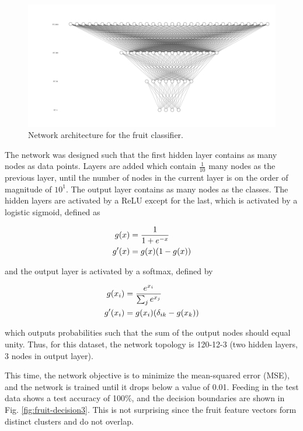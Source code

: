 \documentclass[12pt,a4paper]{article}
\begin{document}
\begin{figure}[htb]
	\centering
	\includegraphics[width=\textwidth]{fruit-net.png}
	\caption{Network architecture for the fruit classifier.}
	\label{fig:fruit-architecture}
\end{figure}

The network was designed such that the first hidden layer contains as many nodes as data points. Layers are added which contain $\frac{1}{10}$ many nodes as the previous layer, until the number of nodes in the current layer is on the order of magnitude of $10^1$. The output layer contains as many nodes as the classes. The hidden layers are activated by a ReLU except for the last, which is activated by a logistic sigmoid, defined as

\begin{align}
	g(x) &= \frac{1}{1 + e^{-x}} \label{eq:sigmoid} \\
	g^\prime(x) &= g(x)\qty(1 - g(x))
\end{align}

\noindent and the output layer is activated by a softmax, defined by

\begin{align}
	g(x_i) &= \frac{e^{x_i}}{\sum_j e^{x_j}} \label{eq:softmax} \\
	g^\prime(x_i) &= g(x_i)\qty(\delta_{ik} - g(x_k))
\end{align}

\noindent which outputs probabilities such that the sum of the output nodes should equal unity. Thus, for this dataset, the network topology is 120-12-3 (two hidden layers, 3 nodes in output layer). 

This time, the network objective is to minimize the mean-squared error (MSE), and the network is trained until it drops below a value of 0.01. Feeding in the test data shows a test accuracy of 100\%, and the decision boundaries are shown in Fig. \ref{fig:fruit-decision3}. This is not surprising since the fruit feature vectors form distinct clusters and do not overlap.
\end{document}
